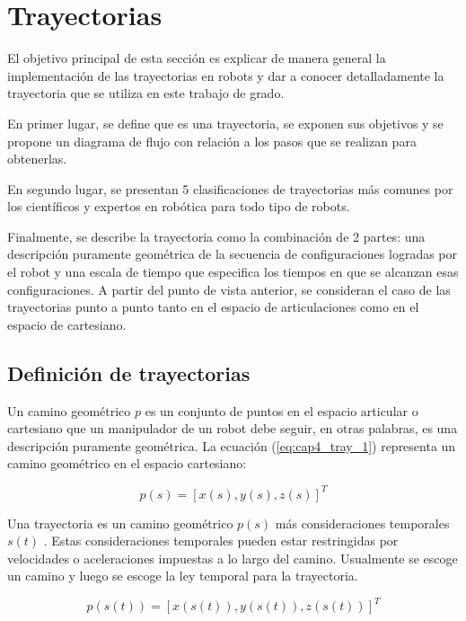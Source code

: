     \newpage

\section{Trayectorias}\label{cap4_tray}

    El objetivo principal de esta sección es explicar de manera general la implementación de las trayectorias en robots y dar a conocer detalladamente la trayectoria que se utiliza en este trabajo de grado.
    
    En primer lugar, se define que es una trayectoria, se exponen sus objetivos y se propone un diagrama de flujo con relación a los pasos que se realizan para obtenerlas.
    
    En segundo lugar, se presentan 5 clasificaciones de trayectorias más comunes por los científicos y expertos en robótica para todo tipo de robots.
    
    Finalmente, se describe la trayectoria como la combinación de 2 partes: una descripción puramente geométrica de la secuencia de configuraciones logradas por el robot y una escala de tiempo que especifica los tiempos en que se alcanzan esas configuraciones. A partir del punto de vista anterior, se consideran el caso de las trayectorias punto a punto tanto en el espacio de articulaciones como en el espacio de cartesiano.
    
    \subsection{Definición de trayectorias}
        Un camino geométrico $p$ es un conjunto de puntos en el espacio articular o cartesiano que un manipulador de un robot debe seguir, en otras palabras, es una descripción puramente geométrica. La ecuación (\ref{eq:cap4_tray_1}) representa un camino geométrico en el espacio cartesiano: 

        \begin{equation}
            p(s) = [x(s), y(s), z(s)]^T
        \label{eq:cap4_tray_1}
    \end{equation}  
    
    Una trayectoria es un camino geométrico $p(s)$  más consideraciones temporales $s(t)$ . Estas consideraciones temporales pueden estar restringidas por velocidades o aceleraciones impuestas a lo largo del camino. Usualmente se escoge un camino y luego se escoge la ley temporal para la trayectoria.
    
    \begin{equation}
            p(s(t)) = [x(s(t)), y(s(t)), z(s(t))]^T
        \label{eq:cap4_tray_2}
    \end{equation}  
    
